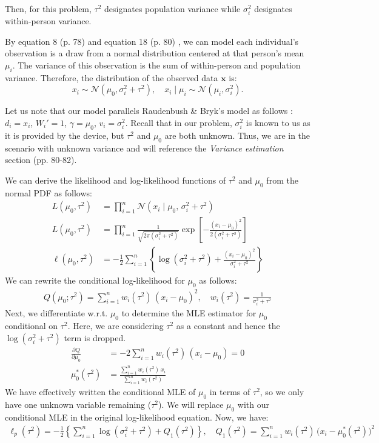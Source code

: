 \documentclass[letterpaper, 11pt]{extarticle}
\begin{document}
Then, for this problem, $\tau^2$ designates population variance while $\sigma_i^2$ designates within-person variance. 

By equation 8 (p. 78) and equation 18 (p. 80) \cite{doi:10.3102/10769986010002075}, we can model each individual's observation is a draw from a normal distribution centered at that person's mean $\mu_i$. The variance of this observation is the sum of within-person and population variance. Therefore, the distribution of the observed data $\textbf{x}$ is:
$$x_i \sim \mathcal{N}(\mu_0, \sigma_i^2+\tau^2), \quad x_i \mid \mu_i \sim \mathcal{N}(\mu_i, \sigma_i^2).$$

Let us note that our model parallels Raudenbush \& Bryk's model as follows \cite{doi:10.3102/10769986010002075}: $d_i = x_i$, $W_i' = 1$, $\gamma = \mu_0$, $v_i = \sigma_i^2$. Recall that in our problem, $\sigma_i^2$ is known to us as it is provided by the device, but $\tau^2$ and $\mu_0$ are both unknown. Thus, we are in the scenario with unknown variance and will reference the \textit{Variance estimation} section (pp. 80-82). 

We can derive the likelihood and log-likelihood functions of $\tau^2$ and $\mu_0$ from the normal PDF as follows:
\begin{align}
L(\mu_0, \tau^2)
&= \prod_{i=1}^{n}
  \mathcal{N}\!\left(x_i \mid \mu_0,\, \sigma_i^2 + \tau^2\right)\\
L(\mu_0, \tau^2)
&= \prod_{i=1}^{n}
  \frac{1}{\sqrt{2\pi(\sigma_i^2 + \tau^2)}}
  \exp\!\left[
    -\frac{(x_i - \mu_0)^2}{2(\sigma_i^2 + \tau^2)}
  \right]\\
  \ell(\mu_0, \tau^2)
&= -\frac{1}{2} \sum_{i=1}^{n}
  \left\{
    \log(\sigma_i^2 + \tau^2)
    + \frac{(x_i - \mu_0)^2}{\sigma_i^2 + \tau^2}
  \right\}
\end{align}
We can rewrite the conditional log-likelihood for $\mu_0$ as follows:
\begin{align}
Q(\mu_0;\tau^2)=\sum_{i=1}^{n}w_i(\tau^2)\,(x_i-\mu_0)^2,
\quad w_i(\tau^2)=\frac{1}{\sigma_i^2+\tau^2}
\end{align}
Next, we differentiate w.r.t. $\mu_0$ to determine the MLE estimator for $\mu_0$ conditional on $\tau^2$. Here, we are considering $\tau^2$ as a constant and hence the $\log(\sigma_i^2 + \tau^2)$ term is dropped.
\begin{align}
    \frac{\partial Q}{\partial \mu_0}
&=-2\sum_{i=1}^{n}w_i(\tau^2)\,(x_i-\mu_0)=0\\
\mu_0^*(\tau^2)&=\frac{\sum_{i=1}^{n} w_i(\tau^2)\,x_i}{\sum_{i=1}^{n} w_i(\tau^2)}
\end{align}
We have effectively written the conditional MLE of $\mu_0$ in terms of $\tau^2$, so we only have one unknown variable remaining ($\tau^2$). We will replace $\mu_0$ with our conditional MLE in the original log-likelihood equation. Now, we have:
\begin{align}
    \ell_p(\tau^2)
= -\frac12\left\{
\sum_{i=1}^{n}\log(\sigma_i^2+\tau^2)
	+	Q_1(\tau^2)
\right\}, \quad Q_1(\tau^2)=\sum_{i=1}^{n} w_i(\tau^2)\,\bigl(x_i-\mu_0^*(\tau^2)\bigr)^2
\end{align} 
\end{document}
